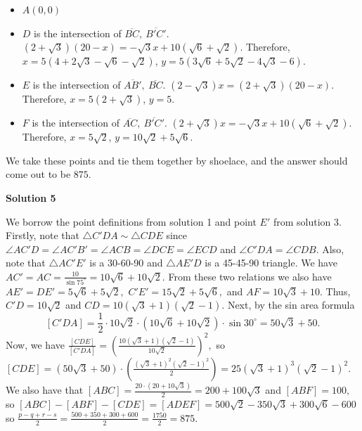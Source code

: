 \begin{enumerate}
 
            \begin{itemize}
        \item $A (0,0)$
            \end{itemize}
            
            \begin{itemize}
        \item $D$ is the intersection of $\overline{BC},\ \overline{B'C'}$. $(2+\sqrt{3})(20-x) = -\sqrt{3}x + 10(\sqrt{6} + \sqrt{2})$. Therefore, $x = 5(4 + 2\sqrt{3}-\sqrt{6}-\sqrt{2})$, $y = 5(3\sqrt{6} + 5\sqrt{2}-4\sqrt{3}-6)$.
            \end{itemize}
            
            \begin{itemize}
        \item $E$ is the intersection of $\overline{AB'},\ \overline{BC}$. $(2 - \sqrt{3})x =(2+\sqrt{3})(20-x)$. Therefore, $x = 5(2+\sqrt{3})$, $y = 5$.
            \end{itemize}
            
            \begin{itemize}
        \item $F$ is the intersection of $\overline{AC},\ \overline{B'C'}$. $(2+\sqrt{3})x = -\sqrt{3}x + 10(\sqrt{6} + \sqrt{2})$. Therefore, $x = 5\sqrt{2}$, $y = 10\sqrt{2}+ 5\sqrt{6}$.
            \end{itemize}
            We take these points and tie them together by shoelace, and the answer should come out to be $\boxed{875}$.

 



\textbf{Solution 5}

We borrow the point definitions from solution 1 and point $E'$ from solution 3. Firstly, note that $\triangle C'DA\sim\triangle CDE$ since $\angle AC'D=\angle AC'B'=\angle ACB=\angle DCE=\angle ECD$ and $\angle C'DA=\angle CDB.$ Also, note that $\triangle AC'E'$ is a 30-60-90 and $\triangle AE'D$ is a 45-45-90 triangle. We have $AC'=AC=\frac{10}{\sin 75^\circ}=10\sqrt6+10\sqrt2.$ From these two relations we also have $AE'=DE'=5\sqrt6+5\sqrt2,$ $C'E'=15\sqrt2+5\sqrt6,$ and $AF=10\sqrt3+10.$ Thus, $C'D=10\sqrt2$ and $CD=10(\sqrt3+1)(\sqrt2-1).$ Next, by the sin area formula 
 \[[C'DA]=\frac12 \cdot 10\sqrt2\cdot (10\sqrt6+10\sqrt2)\cdot\sin 30^\circ=50\sqrt3+50.\] Now, we have $\frac{[CDE]}{[C'DA]}=(\frac{10(\sqrt3+1)(\sqrt2-1)}{10\sqrt2})^2,$ so $[CDE]=(50\sqrt3+50)\cdot (\frac{(\sqrt3+1)^2(\sqrt2-1)^2}2)=25(\sqrt3+1)^3(\sqrt2-1)^2.$ We also have that $[ABC]=\frac{20\cdot (20+10\sqrt3)}2=200+100\sqrt3$ and $[ABF]=100,$ so $[ABC]-[ABF]-[CDE]=[ADEF]=500\sqrt{2} - 350\sqrt{3} + 300\sqrt{6} - 600$ so  $\frac{p-q+r-s}{2} = \frac{500 + 350 + 300 + 600}2 = \frac{1750}2 = \boxed{\boxed{875}}.$


\end{enumerate}
